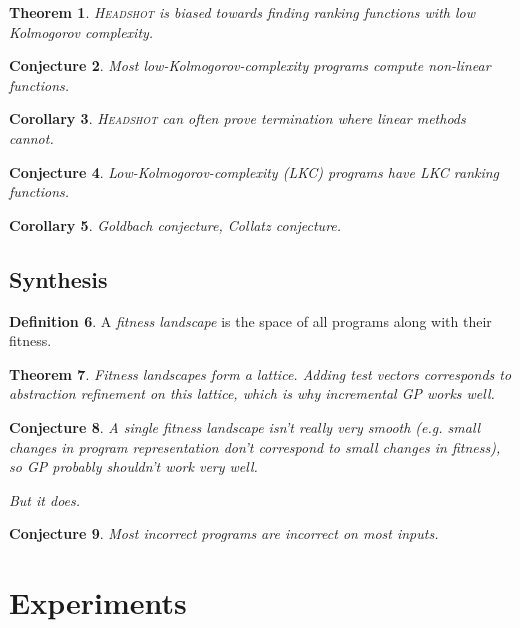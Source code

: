\documentclass[preprint]{sigplanconf}
\newtheorem{theorem}{Theorem}
\newtheorem{corollary}[theorem]{Corollary}
\newtheorem{conjecture}[theorem]{Conjecture}
\theoremstyle{definition}
\newtheorem{definition}[theorem]{Definition}
\begin{document}
\begin{theorem}
 \textsc{Headshot} is biased towards finding ranking functions with low
 Kolmogorov complexity.
\end{theorem}

\begin{conjecture}
 Most low-Kolmogorov-complexity programs compute non-linear functions.
\end{conjecture}

\begin{corollary}
 \textsc{Headshot} can often prove termination where linear methods cannot.
\end{corollary}


\begin{conjecture}
 Low-Kolmogorov-complexity (LKC) programs have LKC ranking functions.
\end{conjecture}

\begin{corollary}
 Goldbach conjecture, Collatz conjecture.
\end{corollary}

\subsection{Synthesis}

\begin{definition}
 A \emph{fitness landscape} is the space of all programs along with their fitness.
\end{definition}

\begin{theorem}
 Fitness landscapes form a lattice.  Adding test vectors corresponds to abstraction refinement on this
 lattice, which is why incremental GP works well.
\end{theorem}

\begin{conjecture}
 A single fitness landscape isn't really very smooth (e.g. small changes in program representation
 don't correspond to small changes in fitness), so GP probably shouldn't work very well.
 
 But it does.
\end{conjecture}

\begin{conjecture}
 Most incorrect programs are incorrect on most inputs.
\end{conjecture}



\section{Experiments}
\end{document}
